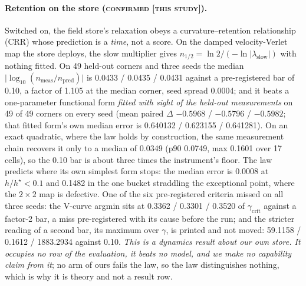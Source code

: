 \documentclass{article} %
\begin{document}
\paragraph{Retention on the store (\textsc{confirmed [this study]}).} Switched on, the field
store's relaxation obeys a curvature--retention relationship (CRR) whose prediction is a
\emph{time}, not a score. On the damped velocity-Verlet map the store deploys, the slow
multiplier gives $n_{1/2}=\ln2/(-\ln\lvert\lambda_{\text{slow}}\rvert)$ with nothing fitted. On 49
held-out corners and three seeds the median $\lvert\log_{10}(n_{\text{meas}}/n_{\text{pred}})\rvert$ is
0.0433 / 0.0435 / 0.0431 against a pre-registered bar of 0.10, a factor of 1.105 at the median
corner, seed spread 0.0004; and it beats a one-parameter functional form \emph{fitted with sight
of the held-out measurements} on 49 of 49 corners on every seed (mean paired $\Delta$ $-0.5968$ /
$-0.5796$ / $-0.5982$; that fitted form's own median error is 0.640132 / 0.623155 / 0.641281).
On an exact quadratic, where the law holds by construction, the same measurement chain recovers it
only to a median of 0.0349 (p90 0.0749, max 0.1601 over 17 cells), so the 0.10 bar is about three
times the instrument's floor. %
The law predicts where its own simplest form stops: the median error is 0.0008 at $h/h^\star<0.1$
and 0.1482 in the one bucket straddling the exceptional point, where the $2\times2$ map is
defective. %
One of the six pre-registered criteria missed on all three seeds: the V-curve argmin sits at 0.3362 /
0.3301 / 0.3520 of $\gamma_{\text{crit}}$ against a factor-2 bar, a miss pre-registered with its
cause before the run; and the stricter reading of a second bar, its maximum over $\gamma$, is
printed and not moved: 59.1158 / 0.1612 / 1883.2934 against 0.10.
\emph{This is a dynamics result about our own store. It occupies no row of the evaluation, it
beats no model, and we make no capability claim from it}; no arm of ours fails the law, so the law
distinguishes nothing, which is why it is theory and not a result row.
\end{document}
